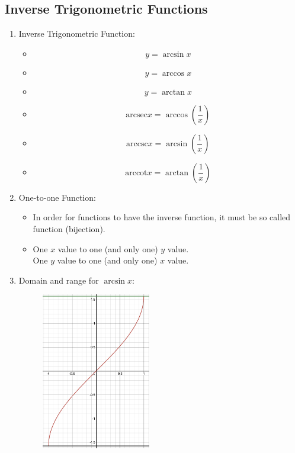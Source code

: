 \documentclass[12pt, a4paper]{article}
\begin{document}
\subsection{Inverse Trigonometric Functions}
\begin{enumerate}
  \item Inverse Trigonometric Function: 
  \begin{itemize}
    \item $$y=\arcsin{x}$$
    \item $$y=\arccos{x}$$
    \item $$y=\arctan{x}$$
    \item $$\text{arcsec}x=\arccos{\left(\frac{1}{x}\right)}$$
    \item $$\text{arccsc}x=\arcsin{\left(\frac{1}{x}\right)}$$
    \item $$\text{arccot}x=\arctan{\left(\frac{1}{x}\right)}$$
  \end{itemize}
  \item One-to-one Function: 
  \begin{itemize}
    \item In order for functions to have the inverse function, it must be so called \textbf{\color{red}{one-to-one}} function (bijection). 
    \item One $x$ value to one (and only one) $y$ value.\\
    One $y$ value to one (and only one) $x$ value. 
  \end{itemize}
  \item Domain and range for $\arcsin{x}$: 
  \begin{itemize}
    \begin{figure}[H]
      \centering
      \includegraphics[width=0.45\textwidth]{Fig.3.31.jpg}

\end{figure}
\end{itemize}
\end{enumerate}
\end{document}
